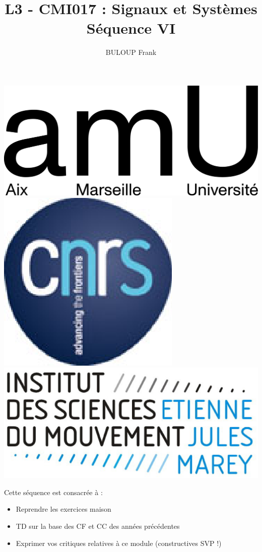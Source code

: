 \documentclass[a4paper,11pt]{beamer}
\title{L3 - CMI017 : Signaux et Systèmes\\Séquence VI}
\author{BULOUP Frank}
\institute{Aix Marseille Université\\Institut des Sciences du Mouvement}
\date{}
\begin{document}
\begin{frame}[plain]  
	\titlepage  
	\vspace{1cm}
	
	\includegraphics[scale=0.6]{images/LogoAMU.png}\hspace*{2cm}
	\includegraphics[scale=0.2]{images/LogoCNRS.eps}\hspace*{2cm} 
	\includegraphics[scale=0.1]{images/LogoISM.eps}
\end{frame}  
  

\begin{frame}
\justifying
Cette séquence est consacrée à :
\begin{itemize}[label=$\bullet$]
  \item Reprendre les exercices maison
  \item TD sur la base des CF et CC des années précédentes
  \item Exprimer vos critiques relatives à ce module (constructives SVP !)
\end{itemize}


\end{frame}

 
 
\end{document}
